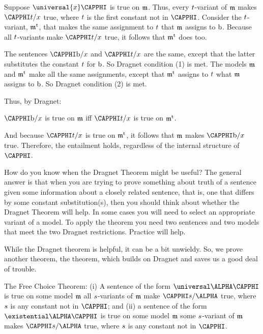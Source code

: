 \begin{PROOF}
Suppose $\universal{\variable{x}}\CAPPHI$ is true on $\mathfrak{m}$. 
Thus, every $t$-variant of $\mathfrak{m}$ makes $\CAPPHI\variable{t}/\variable{x}$ true, where $t$ is the first constant not in $\CAPPHI$. 
Consider the $t$-variant, $\mathfrak{m^{\mathrm{t}}_{\mathrm{}}}$, that makes the same assignment to $t$ that $\mathfrak{m}$ assigns to $\mathrm{b}$. Because all $t$-variants make $\CAPPHI\variable{t}/\variable{x}$ true, it follows that $\mathfrak{m^{\mathrm{t}}_{\mathrm{}}}$ does too.

The sentences $\CAPPHI\constant{b}/\variable{x}$ and $\CAPPHI\variable{t}/\variable{x}$ are the same, except that the latter substitutes the constant $t$ for $\mathrm{b}$.  So Dragnet condition (1) is met.  The models $\mathfrak{m}$ and $\mathfrak{m^{\mathrm{t}}_{\mathrm{}}}$ make all the same assignments, except that $\mathfrak{m^{\mathrm{t}}_{\mathrm{}}}$ assigns to $t$ what $\mathfrak{m}$ assigns to $\mathrm{b}$.  So Dragnet condition (2) is met.

Thus, by Dragnet:
\begin{center}
	$\CAPPHI\constant{b}/\variable{x}$ is true on $\mathfrak{m}$ iff $\CAPPHI\variable{t}/\variable{x}$ is true on $\mathfrak{m^{\mathrm{t}}_{\mathrm{}}}$.
\end{center}
And because $\CAPPHI\variable{t}/\variable{x}$ is true on $\mathfrak{m^{\mathrm{t}}_{\mathrm{}}}$, it follows that $\mathfrak{m}$ makes $\CAPPHI\constant{b}/\variable{x}$ true.  Therefore, the entailment holds, regardless of the internal structure of $\CAPPHI$.
\end{PROOF} 

How do you know when the Dragnet Theorem might be useful? 
The general answer is that when you are trying to prove something about truth of a sentence given some information about a closely related sentence, that is, one that differs by some constant substitution(s), then you should think about whether the Dragnet Theorem will help. 
In some cases you will need to select an appropriate variant of a model. 
To apply the theorem you need two sentences and two models that meet the two Dragnet restrictions. Practice will help.

While the Dragnet theorem is helpful, it can be a bit unwieldy.  So, we prove another theorem, the  theorem, which builds on Dragnet and saves us a good deal of trouble.

\begin{THEOREM}{ The Free Choice Theorem:}
(i) A \GQL{} sentence of the form $\universal\ALPHA\CAPPHI$ is true on some model $\mathfrak{m}$ \Iff all $s$-variants of $\mathfrak{m}$ make $\CAPPHI\variable{s}/\ALPHA$ true, where $s$ is any constant not in $\CAPPHI$; and (ii) a \GQL{} sentence of the form $\existential\ALPHA\CAPPHI$ is true on some model $\mathfrak{m}$ \Iff some $s$-variant of $\mathfrak{m}$ makes $\CAPPHI\variable{s}/\ALPHA$ true, where $s$ is any constant not in $\CAPPHI$.
\end{THEOREM}

